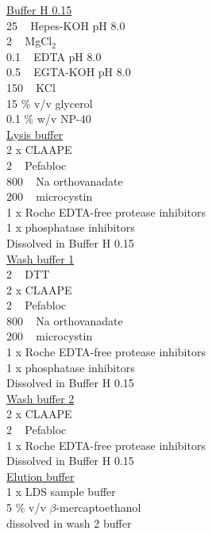 \underline{Buffer H 0.15}\\
25 \si{\milli\Molar} Hepes-KOH pH 8.0\\
2 \si{\milli\Molar} MgCl$_{2}$\\
0.1 \si{\milli\Molar} EDTA pH 8.0\\
0.5 \si{\milli\Molar} EGTA-KOH pH 8.0\\
150 \si{\milli\Molar} KCl\\
15 \% v/v glycerol\\
0.1 \% w/v NP-40\\

\underline{Lysis buffer}\\
2 x CLAAPE\\
2 \si{\milli\Molar} Pefabloc\\
800 \si{\micro\Molar} Na orthovanadate\\
200 \si{\nano\Molar} microcystin \\
1 x Roche EDTA-free protease inhibitors\\
1 x phosphatase inhibitors\\
Dissolved in Buffer H 0.15\\

\underline{Wash buffer 1}\\
2 \si{\milli\Molar} DTT \\
2 x CLAAPE\\
2 \si{\milli\Molar} Pefabloc\\
800 \si{\micro\Molar} Na orthovanadate\\
200 \si{\nano\Molar} microcystin \\
1 x Roche EDTA-free protease inhibitors\\
1 x phosphatase inhibitors\\
Dissolved in Buffer H 0.15\\

\underline{Wash buffer 2}\\
2 x CLAAPE\\
2 \si{\milli\Molar} Pefabloc\\
1 x Roche EDTA-free protease inhibitors\\
Dissolved in Buffer H 0.15\\

\underline{Elution buffer}\\
1 x LDS sample buffer\\
5 \% v/v $\beta$-mercaptoethanol\\
dissolved in wash 2 buffer\\

